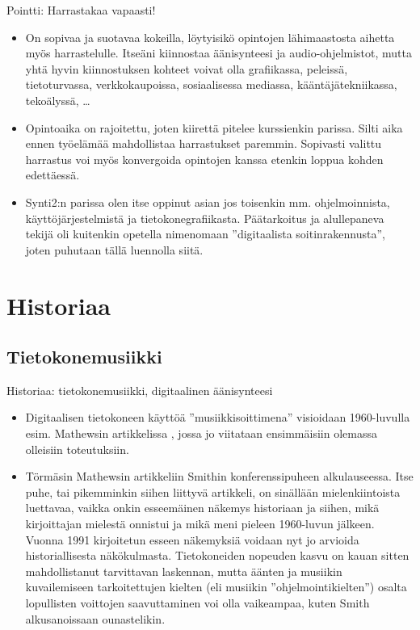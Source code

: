 \documentclass[pdf,handout,10pt]{beamer}
\begin{document}
\begin{frame}{Pointti: Harrastakaa vapaasti!}
  \begin{itemize}
    \item
  On sopivaa ja suotavaa kokeilla, löytyisikö opintojen lähimaastosta
  aihetta myös harrastelulle. Itseäni kiinnostaa äänisynteesi ja
  audio-ohjelmistot, mutta yhtä hyvin kiinnostuksen kohteet voivat
  olla grafiikassa, peleissä, tietoturvassa, verkkokaupoissa,
  sosiaalisessa mediassa, kääntäjätekniikassa, tekoälyssä, \ldots

\item
  Opintoaika on rajoitettu, joten kiirettä pitelee kurssienkin
  parissa. Silti aika ennen työelämää mahdollistaa harrastukset
  paremmin. Sopivasti valittu harrastus voi myös konvergoida opintojen
  kanssa etenkin loppua kohden edettäessä.

\item
  Synti2:n parissa olen itse oppinut asian jos toisenkin
  mm. ohjelmoinnista, käyttöjärjestelmistä ja tietokonegrafiikasta.
  Päätarkoitus ja alullepaneva tekijä oli kuitenkin opetella
  nimenomaan ''digitaalista soitinrakennusta'', joten puhutaan tällä
  luennolla siitä.
\end{itemize}
\end{frame}

\section{Historiaa}

\subsection{Tietokonemusiikki}
\begin{frame}{Historiaa: tietokonemusiikki, digitaalinen äänisynteesi}
  \begin{itemize}
    \item
  Digitaalisen tietokoneen käyttöä ''musiikkisoittimena'' visioidaan
  1960-luvulla esim. Mathewsin artikkelissa
  \cite{Mathews63thedigital}, jossa jo viitataan ensimmäisiin olemassa
  olleisiin toteutuksiin.

    \item
  Törmäsin Mathewsin artikkeliin Smithin konferenssipuheen
  \cite{smith1991viewpoints} alkulauseessa. Itse puhe, tai pikemminkin siihen
  liittyvä artikkeli, on sinällään mielenkiintoista luettavaa, vaikka
  onkin esseemäinen näkemys historiaan ja siihen, mikä kirjoittajan
  mielestä onnistui ja mikä meni pieleen 1960-luvun jälkeen. Vuonna
  1991 kirjoitetun esseen näkemyksiä voidaan nyt jo arvioida
  historiallisesta näkökulmasta. Tietokoneiden nopeuden kasvu on kauan
  sitten mahdollistanut tarvittavan laskennan, mutta äänten ja
  musiikin kuvailemiseen tarkoitettujen kielten (eli
  musiikin ''ohjelmointikielten'') osalta lopullisten voittojen
  saavuttaminen voi olla vaikeampaa, kuten Smith alkusanoissaan
  ounastelikin.
  \end{itemize}
\end{frame}
\end{document}
